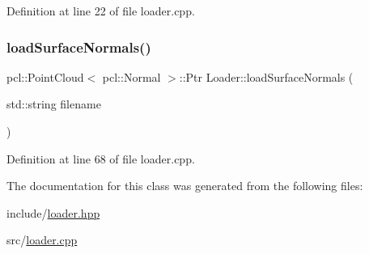Definition at line 22 of file loader.\+cpp.

\hypertarget{class_loader_a13951e27d82737d95c9ad7b67146f433}{}\label{class_loader_a13951e27d82737d95c9ad7b67146f433} 
\subsubsection{\texorpdfstring{load\+Surface\+Normals()}{loadSurfaceNormals()}}
{\footnotesize\ttfamily pcl\+::\+Point\+Cloud$<$ pcl\+::\+Normal $>$\+::Ptr Loader\+::load\+Surface\+Normals (\begin{DoxyParamCaption}\item[{std\+::string}]{filename }\end{DoxyParamCaption})}



Definition at line 68 of file loader.\+cpp.



The documentation for this class was generated from the following files\+:\begin{DoxyCompactItemize}
\item 
include/\hyperlink{loader_8hpp}{loader.\+hpp}\item 
src/\hyperlink{loader_8cpp}{loader.\+cpp}\end{DoxyCompactItemize}
